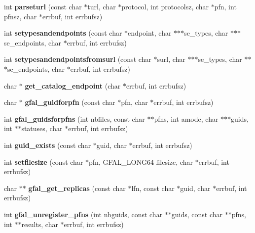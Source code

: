 \begin{CompactItemize}
\item 
int \textbf{parseturl} (const char $\ast$turl, char $\ast$protocol, int protocolsz, char $\ast$pfn, int pfnsz, char $\ast$errbuf, int errbufsz)\label{gfal__common_8c_1592fb1bdd6aa5ab4c56e3aaf9240b98}

\item 
int \textbf{setypesandendpoints} (const char $\ast$endpoint, char $\ast$$\ast$$\ast$se\_\-types, char $\ast$$\ast$$\ast$se\_\-endpoints, char $\ast$errbuf, int errbufsz)\label{gfal__common_8c_42f0dde4abdd73f485da45932283f669}

\item 
int \textbf{setypesandendpointsfromsurl} (const char $\ast$surl, char $\ast$$\ast$$\ast$se\_\-types, char $\ast$$\ast$$\ast$se\_\-endpoints, char $\ast$errbuf, int errbufsz)\label{gfal__common_8c_563ab483cd3ebb8e7d365d7803523ff5}

\item 
char $\ast$ \textbf{get\_\-catalog\_\-endpoint} (char $\ast$errbuf, int errbufsz)\label{gfal__common_8c_43eaae6782e74a6d25cd0a0f8183833e}

\item 
char $\ast$ \textbf{gfal\_\-guidforpfn} (const char $\ast$pfn, char $\ast$errbuf, int errbufsz)\label{group__internal__group_g86568afb8c7f9b0d6944de793a3e867a}

\item 
int \textbf{gfal\_\-guidsforpfns} (int nbfiles, const char $\ast$$\ast$pfns, int amode, char $\ast$$\ast$$\ast$guids, int $\ast$$\ast$statuses, char $\ast$errbuf, int errbufsz)\label{group__internal__group_g72f2d9fb6a55816f243a4c57c5369fe5}

\item 
int \textbf{guid\_\-exists} (const char $\ast$guid, char $\ast$errbuf, int errbufsz)\label{gfal__common_8c_a880588c2bf383146384431128d4cf88}

\item 
int \textbf{setfilesize} (const char $\ast$pfn, GFAL\_\-LONG64 filesize, char $\ast$errbuf, int errbufsz)\label{gfal__common_8c_ba9082c3f661f0aa6a1f4398031a5b52}

\item 
char $\ast$$\ast$ \textbf{gfal\_\-get\_\-replicas} (const char $\ast$lfn, const char $\ast$guid, char $\ast$errbuf, int errbufsz)\label{group__internal__group_gbd0a581309f65e07a5e28d442f07b169}

\item 
int \textbf{gfal\_\-unregister\_\-pfns} (int nbguids, const char $\ast$$\ast$guids, const char $\ast$$\ast$pfns, int $\ast$$\ast$results, char $\ast$errbuf, int errbufsz)\label{group__internal__group_g70f889fa2436723fb7b3cff20b661f21}


\end{CompactItemize}
